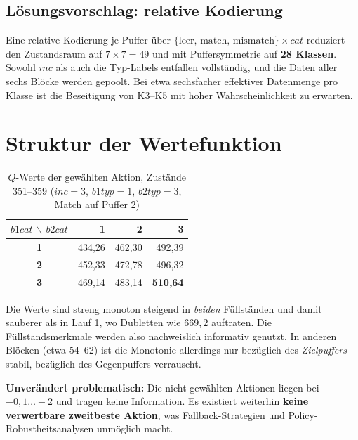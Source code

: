 \documentclass[11pt,a4paper]{article}
\begin{document}
\subsection{Lösungsvorschlag: relative Kodierung}

Eine relative Kodierung je Puffer über
$\{\text{leer},\,\text{match},\,\text{mismatch}\} \times cat$
reduziert den Zustandsraum auf $7 \times 7 = 49$ und mit Puffersymmetrie auf
\textbf{28 Klassen}. Sowohl $inc$ als auch die Typ-Labels entfallen
vollständig, und die Daten aller sechs Blöcke werden gepoolt. Bei etwa
sechsfacher effektiver Datenmenge pro Klasse ist die Beseitigung von
K3--K5 mit hoher Wahrscheinlichkeit zu erwarten.

\section{Struktur der Wertefunktion}

\begin{table}[htbp]
\centering
\caption{$Q$-Werte der gewählten Aktion, Zustände 351--359
($inc=3$, $b1typ=1$, $b2typ=3$, Match auf Puffer 2)}
\label{tab:wertefunktion}
\begin{tabular}{@{}c rrr@{}}
\toprule
$b1cat \,\backslash\, b2cat$ & \textbf{1} & \textbf{2} & \textbf{3} \\
\midrule
\textbf{1} & 434,26 & 462,30 & 492,39 \\
\textbf{2} & 452,33 & 472,78 & 496,32 \\
\textbf{3} & 469,14 & 483,14 & \textbf{510,64} \\
\bottomrule
\end{tabular}
\end{table}

\noindent
Die Werte sind streng monoton steigend in \emph{beiden} Füllständen und
damit sauberer als in Lauf 1, wo Dubletten wie $669{,}2$ auftraten. Die
Füllstandsmerkmale werden also nachweislich informativ genutzt. In anderen
Blöcken (etwa 54--62) ist die Monotonie allerdings nur bezüglich des
\emph{Zielpuffers} stabil, bezüglich des Gegenpuffers verrauscht.

\medskip\noindent
\textbf{Unverändert problematisch:} Die nicht gewählten Aktionen liegen bei
$-0{,}1 \ldots -2$ und tragen keine Information. Es existiert weiterhin
\textbf{keine verwertbare zweitbeste Aktion}, was Fallback-Strategien und
Policy-Robustheitsanalysen unmöglich macht.
\end{document}
